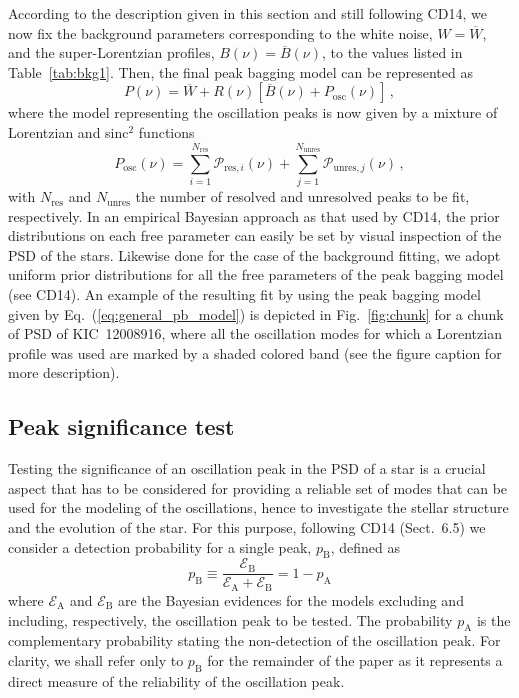\documentclass[structabstract]{aa}
\newcommand{\evid}{\mathcal{E}}
\newcommand{\pa}{p_\mathrm{A}}
\newcommand{\pb}{p_\mathrm{B}}
\newcommand{\kic}{KIC~12008916}
\begin{document}
According to the description given in this section and still following CD14, we now fix the background parameters corresponding to the white noise, $W = \overline{W}$, and the super-Lorentzian profiles, $B \left( \nu \right) = \overline{B} \left( \nu \right)$, to the values listed in Table~\ref{tab:bkg1}. Then, the final peak bagging model can be represented as
\begin{equation}
P \left( \nu \right) = \overline{W} + R \left(\nu \right) \left[ \overline{B} \left( \nu \right) + P_\mathrm{osc} \left( \nu \right)\right] \, , 
\label{eq:general_pb_model}
\end{equation}
where the model representing the oscillation peaks is now given by a mixture of Lorentzian and sinc$^2$ functions
\begin{equation}
P_\mathrm{osc} \left( \nu \right) = \sum^{N_\mathrm{res}}_{i=1} \mathcal{P}_{\mathrm{res},i} \left( \nu \right) + \sum^{N_\mathrm{unres}}_{j=1} \mathcal{P}_{\mathrm{unres},j} \left( \nu \right) \, ,
\label{eq:pb_model}
\end{equation}
with $N_\mathrm{res}$ and $N_\mathrm{unres}$ the number of resolved and unresolved peaks to be fit, respectively. In an empirical Bayesian approach as that used by CD14, the prior distributions on each free parameter can easily be set by visual inspection of the PSD of the stars. Likewise done for the case of the background fitting, we adopt uniform prior distributions for all the free parameters of the peak bagging model (see CD14). An example of the resulting fit by using the peak bagging model given by Eq.~(\ref{eq:general_pb_model}) is depicted in Fig.~\ref{fig:chunk} for a chunk of PSD of \kic, where all the oscillation modes for which a Lorentzian profile was used are marked by a shaded colored band (see the figure caption for more description).

\subsection{Peak significance test}
\label{sec:test}
Testing the significance of an oscillation peak in the PSD of a star is a crucial aspect that has to be considered for providing a reliable set of modes that can be used for the modeling of the oscillations, hence to investigate the stellar structure and the evolution of the star. For this purpose, following CD14 (Sect.~6.5) we consider a detection probability for a single peak, $\pb$, defined as
\begin{equation}
\pb \equiv \frac{\evid_\mathrm{B}}{\evid_\mathrm{A} + \evid_\mathrm{B}} = 1 - \pa
\label{eq:detection_probability}
\end{equation}
where $\evid_\mathrm{A}$ and $\evid_\mathrm{B}$ are the Bayesian evidences for the models excluding and including, respectively, the oscillation peak to be tested. The probability $\pa$ is the complementary probability stating the non-detection of the oscillation peak. For clarity, we shall refer only to $\pb$ for the remainder of the paper as it represents a direct measure of the reliability of the oscillation peak.
\end{document}
